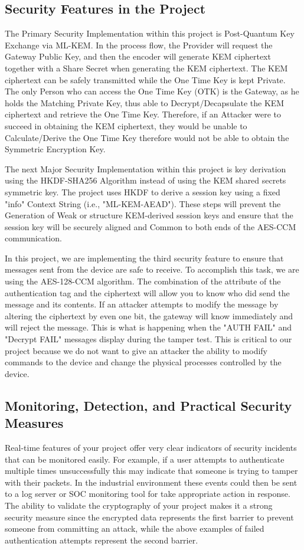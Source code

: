 \documentclass[a4paper]{scrartcl}
\begin{document}
        \subsection{Security Features in the Project}
        The Primary Security Implementation within this project is Post-Quantum Key Exchange via ML-KEM. In the process flow, the Provider will request the Gateway Public Key, and then the encoder will generate KEM ciphertext together with a Share Secret when generating the KEM ciphertext. The KEM ciphertext can be safely transmitted while the One Time Key is kept Private. The only Person who can access the One Time Key (OTK) is the Gateway, as he holds the Matching Private Key, thus able to Decrypt/Decapsulate the KEM ciphertext and retrieve the One Time Key. Therefore, if an Attacker were to succeed in obtaining the KEM ciphertext, they would be unable to Calculate/Derive the One Time Key therefore would not be able to obtain the Symmetric Encryption Key.

        The next Major Security Implementation within this project is key derivation using the HKDF-SHA256 Algorithm instead of using the KEM shared secrets symmetric key. The project uses HKDF to derive a session key using a fixed "info" Context String (i.e., "ML-KEM-AEAD"). These steps will prevent the Generation of Weak or structure KEM-derived session keys and ensure that the session key will be securely aligned and Common to both ends of the AES-CCM communication.

        In this project, we are implementing the third security feature to ensure that messages sent from the device are safe to receive. To accomplish this task, we are using the AES-128-CCM algorithm. The combination of the attribute of the authentication tag and the ciphertext will allow you to know who did send the message and its contents. If an attacker attempts to modify the message by altering the ciphertext by even one bit, the gateway will know immediately and will reject the message. This is what is happening when the "AUTH FAIL" and "Decrypt FAIL" messages display during the tamper test. This is critical to our project because we do not want to give an attacker the ability to modify commands to the device and change the physical processes controlled by the device.

        \subsection{Monitoring, Detection, and Practical Security Measures}
        Real-time features of your project offer very clear indicators of security incidents that can be monitored easily. For example, if a user attempts to authenticate multiple times unsuccessfully this may indicate that someone is trying to tamper with their packets. In the industrial environment these events could then be sent to a log server or SOC monitoring tool for take appropriate action in response. The ability to validate the cryptography of your project makes it a strong security measure since the encrypted data represents the first barrier to prevent someone from committing an attack, while the above examples of failed authentication attempts represent the second barrier.
\end{document}

